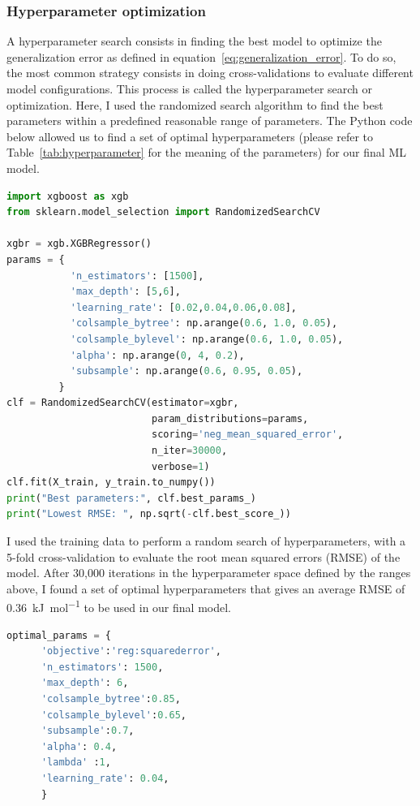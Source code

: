 \documentclass[main]{subfiles}
\begin{document}
\subsubsection{Hyperparameter optimization}\label{sct:hyperparameter}

A hyperparameter search consists in finding the best model to optimize the generalization error as defined in equation~\ref{eq:generalization_error}. To do so, the most common strategy consists in doing cross-validations to evaluate different model configurations. This process is called the hyperparameter search or optimization. Here, I used the randomized search algorithm to find the best parameters within a predefined reasonable range of parameters. The Python code below allowed us to find a set of optimal hyperparameters (please refer to Table~\ref{tab:hyperparameter} for the meaning of the parameters) for our final ML model.

\begin{lstlisting}[language=Python]
import xgboost as xgb
from sklearn.model_selection import RandomizedSearchCV

xgbr = xgb.XGBRegressor()
params = {
           'n_estimators': [1500],
           'max_depth': [5,6],
           'learning_rate': [0.02,0.04,0.06,0.08],
           'colsample_bytree': np.arange(0.6, 1.0, 0.05),
           'colsample_bylevel': np.arange(0.6, 1.0, 0.05),
           'alpha': np.arange(0, 4, 0.2),
           'subsample': np.arange(0.6, 0.95, 0.05),
         }
clf = RandomizedSearchCV(estimator=xgbr,
                         param_distributions=params,
                         scoring='neg_mean_squared_error',
                         n_iter=30000,
                         verbose=1)
clf.fit(X_train, y_train.to_numpy())
print("Best parameters:", clf.best_params_)
print("Lowest RMSE: ", np.sqrt(-clf.best_score_))
\end{lstlisting}

I used the training data to perform a random search of hyperparameters, with a 5-fold cross-validation to evaluate the root mean squared errors (RMSE) of the model.
After 30,000 iterations in the hyperparameter space defined by the ranges above, I found a set of optimal hyperparameters that gives an average RMSE of \SI{0.36}{\kilo\joule\per\mole} to be used in our final model.

\begin{lstlisting}[language=Python]
  optimal_params = {
      'objective':'reg:squarederror',
      'n_estimators': 1500,
      'max_depth': 6,
      'colsample_bytree':0.85,
      'colsample_bylevel':0.65,
      'subsample':0.7,
      'alpha': 0.4,
      'lambda' :1,
      'learning_rate': 0.04,
      }
  \end{lstlisting}
\end{document}
